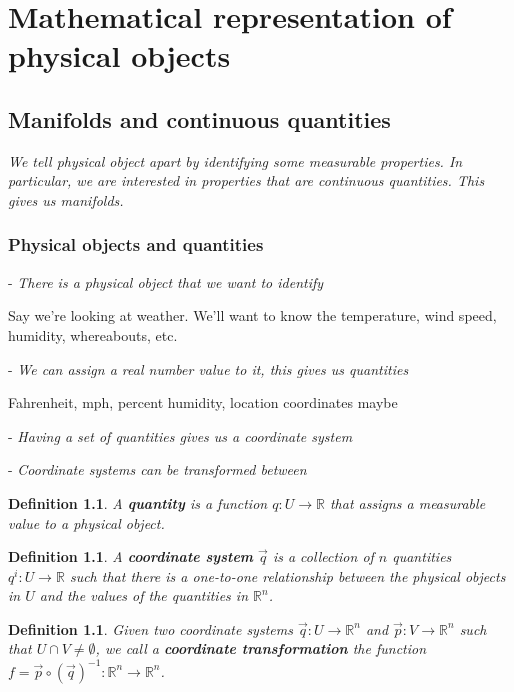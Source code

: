 \documentclass{book}
\newtheorem{defn}[equation]{Definition}
\begin{document}
\tableofcontents

\chapter{Mathematical representation of physical objects}



\section{Manifolds and continuous quantities}
\emph{We tell physical object apart by identifying some measurable properties. In particular, we are interested in properties that are continuous quantities. This gives us manifolds.}

\subsection{Physical objects and quantities}

- \emph{There is a physical object that we want to identify}

Say we're looking at weather. We'll want to know the temperature, wind speed, humidity, whereabouts, etc.

- \emph{We can assign a real number value to it, this gives us quantities}

Fahrenheit, mph, percent humidity, location coordinates maybe


- \emph{Having a set of quantities gives us a coordinate system}



- \emph{Coordinate systems can be transformed between}



\begin{defn}
	A \textbf{quantity} is a function $q : U \to \mathbb{R}$ that assigns a measurable value to a physical object.
\end{defn}

\begin{defn}
	A \textbf{coordinate system} $\vec{q}$ is a collection of $n$ quantities $q^i : U \to \mathbb{R}$ such that there is a one-to-one relationship between the physical objects in $U$ and the values of the quantities in $\mathbb{R}^n$.
\end{defn}

\begin{defn}
	Given two coordinate systems  $\vec{q} : U \to \mathbb{R}^n$ and $\vec{p} : V \to \mathbb{R}^n$ such that $U \cap V \neq \emptyset$, we call a \textbf{coordinate transformation} the function $f = \vec{p} \circ (\vec{q})^{-1} : \mathbb{R}^n \to \mathbb{R}^n$.
\end{defn}
\end{document}
